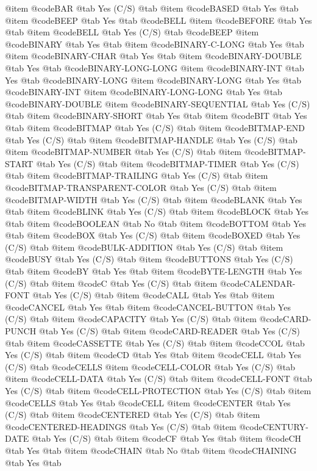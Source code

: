 @item @code{BAR} @tab Yes	(C/S) @tab 
@item @code{BASED} @tab Yes @tab 
@item @code{BEEP} @tab Yes @tab @code{BELL}
@item @code{BEFORE} @tab Yes @tab 
@item @code{BELL} @tab Yes	(C/S) @tab @code{BEEP}
@item @code{BINARY} @tab Yes @tab 
@item @code{BINARY-C-LONG} @tab Yes @tab 
@item @code{BINARY-CHAR} @tab Yes @tab 
@item @code{BINARY-DOUBLE} @tab Yes @tab @code{BINARY-LONG-LONG}
@item @code{BINARY-INT} @tab Yes @tab @code{BINARY-LONG}
@item @code{BINARY-LONG} @tab Yes @tab @code{BINARY-INT}
@item @code{BINARY-LONG-LONG} @tab Yes @tab @code{BINARY-DOUBLE}
@item @code{BINARY-SEQUENTIAL} @tab Yes	(C/S) @tab 
@item @code{BINARY-SHORT} @tab Yes @tab 
@item @code{BIT} @tab Yes @tab 
@item @code{BITMAP} @tab Yes	(C/S) @tab 
@item @code{BITMAP-END} @tab Yes	(C/S) @tab 
@item @code{BITMAP-HANDLE} @tab Yes	(C/S) @tab 
@item @code{BITMAP-NUMBER} @tab Yes	(C/S) @tab 
@item @code{BITMAP-START} @tab Yes	(C/S) @tab 
@item @code{BITMAP-TIMER} @tab Yes	(C/S) @tab 
@item @code{BITMAP-TRAILING} @tab Yes	(C/S) @tab 
@item @code{BITMAP-TRANSPARENT-COLOR} @tab Yes	(C/S) @tab 
@item @code{BITMAP-WIDTH} @tab Yes	(C/S) @tab 
@item @code{BLANK} @tab Yes @tab 
@item @code{BLINK} @tab Yes	(C/S) @tab 
@item @code{BLOCK} @tab Yes @tab 
@item @code{BOOLEAN} @tab No @tab 
@item @code{BOTTOM} @tab Yes @tab 
@item @code{BOX} @tab Yes	(C/S) @tab 
@item @code{BOXED} @tab Yes	(C/S) @tab 
@item @code{BULK-ADDITION} @tab Yes	(C/S) @tab 
@item @code{BUSY} @tab Yes	(C/S) @tab 
@item @code{BUTTONS} @tab Yes	(C/S) @tab 
@item @code{BY} @tab Yes @tab 
@item @code{BYTE-LENGTH} @tab Yes	(C/S) @tab 
@item @code{C} @tab Yes	(C/S) @tab 
@item @code{CALENDAR-FONT} @tab Yes	(C/S) @tab 
@item @code{CALL} @tab Yes @tab 
@item @code{CANCEL} @tab Yes @tab 
@item @code{CANCEL-BUTTON} @tab Yes	(C/S) @tab 
@item @code{CAPACITY} @tab Yes	(C/S) @tab 
@item @code{CARD-PUNCH} @tab Yes	(C/S) @tab 
@item @code{CARD-READER} @tab Yes	(C/S) @tab 
@item @code{CASSETTE} @tab Yes	(C/S) @tab 
@item @code{CCOL} @tab Yes	(C/S) @tab 
@item @code{CD} @tab Yes @tab 
@item @code{CELL} @tab Yes	(C/S) @tab @code{CELLS}
@item @code{CELL-COLOR} @tab Yes	(C/S) @tab 
@item @code{CELL-DATA} @tab Yes	(C/S) @tab 
@item @code{CELL-FONT} @tab Yes	(C/S) @tab 
@item @code{CELL-PROTECTION} @tab Yes	(C/S) @tab 
@item @code{CELLS} @tab Yes @tab @code{CELL}
@item @code{CENTER} @tab Yes	(C/S) @tab 
@item @code{CENTERED} @tab Yes	(C/S) @tab 
@item @code{CENTERED-HEADINGS} @tab Yes	(C/S) @tab 
@item @code{CENTURY-DATE} @tab Yes	(C/S) @tab 
@item @code{CF} @tab Yes @tab 
@item @code{CH} @tab Yes @tab 
@item @code{CHAIN} @tab No @tab 
@item @code{CHAINING} @tab Yes @tab 
